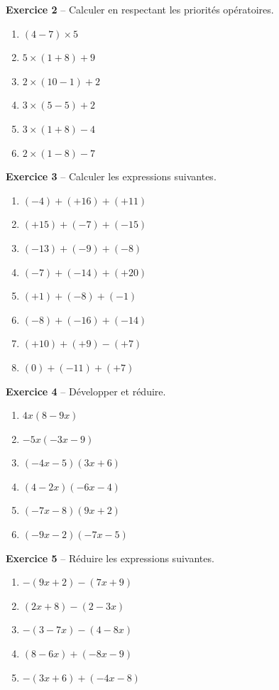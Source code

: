 \documentclass[12pt,a4paper,french]{article}
\begin{document}
\noindent\textbf{Exercice 2} -- Calculer en respectant les priorités opératoires.
\begin{enumerate}
\item $(4 - 7) \times 5$
\item $5 \times (1 + 8) + 9$
\item $2 \times (10 - 1) + 2$
\item $3 \times (5 - 5) + 2$
\item $3 \times (1 + 8) - 4$
\item $2 \times (1 - 8) - 7$
\end{enumerate}
\bigskip

\noindent\textbf{Exercice 3} -- Calculer les expressions suivantes.
\begin{enumerate}
\item $(-4) + (+16) + (+11)$
\item $(+15) + (-7) + (-15)$
\item $(-13) + (-9) + (-8)$
\item $(-7) + (-14) + (+20)$
\item $(+1) + (-8) + (-1)$
\item $(-8) + (-16) + (-14)$
\item $(+10) + (+9) - (+7)$
\item $(0) + (-11) + (+7)$
\end{enumerate}
\bigskip

\noindent\textbf{Exercice 4} -- Développer et réduire.
\begin{enumerate}
\item $4x(8 - 9x)$
\item $-5x(-3x - 9)$
\item $(-4x - 5)(3x + 6)$
\item $(4 - 2x)(-6x - 4)$
\item $(-7x - 8)(9x + 2)$
\item $(-9x - 2)(-7x - 5)$
\end{enumerate}
\bigskip

\noindent\textbf{Exercice 5} -- Réduire les expressions suivantes.
\begin{enumerate}
\item $-(9x + 2)-(7x + 9)$
\item $(2x + 8)-(2 - 3x)$
\item $-(3 - 7x)-(4 - 8x)$
\item $(8 - 6x)+(-8x - 9)$
\item $-(3x + 6)+(-4x - 8)$
\end{enumerate}
\bigskip
\end{document}
